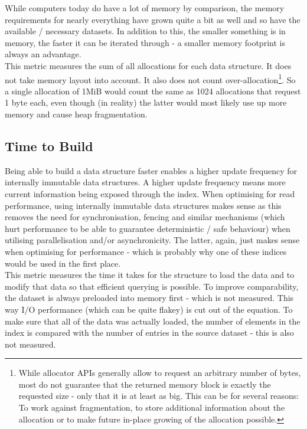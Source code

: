 While computers today do have a lot of memory by comparison, the memory requirements for nearly everything have grown quite a bit as well and so have the available / necessary datasets. In addition to this, the smaller something is in memory, the faster it can be iterated through - a smaller memory footprint is always an advantage.\\
This metric measures the sum of all allocations for each data structure. It does not take memory layout into account. It also does not count over-allocation\footnote{While allocator \acsp{API} generally allow to request an arbitrary number of bytes, most do not guarantee that the returned memory block is exactly the requested size - only that it is at least as big. This can be for several reasons: To work against fragmentation, to store additional information about the allocation or to make future in-place growing of the allocation possible.}. So a single allocation of 1MiB would count the same as 1024 allocations that request 1 byte each, even though (in reality) the latter would most likely use up more memory and cause heap fragmentation.

\subsection{Time to Build}

Being able to build a data structure faster enables a higher update frequency for internally immutable data structures. A higher update frequency means more current information being exposed through the index. When optimising for read performance, using internally immutable data structures makes sense as this removes the need for synchronisation, fencing and similar mechanisms (which hurt performance to be able to guarantee deterministic / safe behaviour) when utilising parallelisation and/or asynchronicity. The latter, again, just makes sense when optimising for performance - which is probably why one of these indices would be used in the first place.\\
This metric measures the time it takes for the structure to load the data and to modify that data so that efficient querying is possible. To improve comparability, the dataset is always preloaded into memory first - which is not measured. This way \acs{I/O} performance (which can be quite flakey) is cut out of the equation. To make sure that all of the data was actually loaded, the number of elements in the index is compared with the number of entries in the source dataset - this is also not measured.

